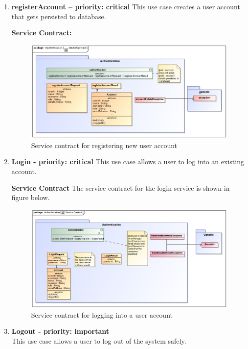 \begin{enumerate}

\item \textbf{registerAccount  – priority: critical } 
This use case creates  a user account that gets persisted to database.

\textbf{Service Contract:}

\begin{figure}[h]
		\includegraphics[scale=0.9]{epsImages/Authentication/serviceContract.eps}
		\caption{Service contract for registering new user account}
\end{figure}

\newpage
\item \textbf{Login - priority: critical}
This use case allows a user to log into an existing account.

\par{\textbf{Service Contract} The service contract for the login service is shown in figure below.}
\begin{figure}[h]
		\includegraphics[scale=0.9]{epsImages/Authentication/LoginServiceContract.eps}
		\caption{Service contract for logging into a user account}
\end{figure}

\item \textbf{Logout - priority: important} \\
This use case allows a user to log out of the system safely. \\ \\


\end{enumerate}
